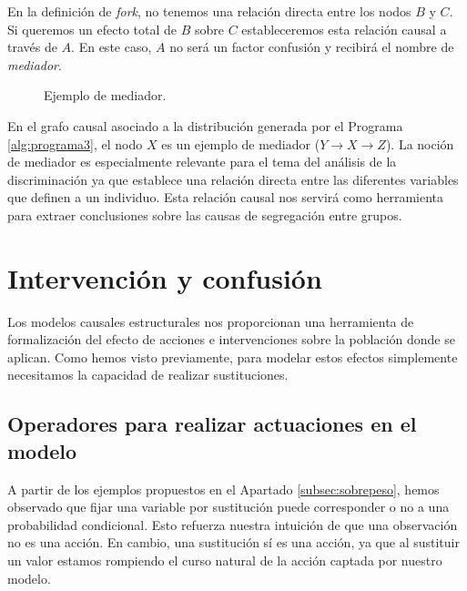 \documentclass[oneside,openright,titlepage,numbers=noenddot,openany,headinclude,footinclude=true,
cleardoublepage=empty,abstractoff,BCOR=5mm,paper=a4,fontsize=12pt,main=spanish]{scrreprt}
\begin{document}
En la definición de \textit{fork}, no tenemos una relación directa entre los nodos $B$ y $C$. Si queremos un efecto total de $B$ sobre $C$ estableceremos esta relación causal a través de $A$. En este caso, $A$ no será un factor confusión y recibirá el nombre de \textit{mediador}.\\

\begin{figure}[h]
\centering
{}
\caption{Ejemplo de mediador.}
\label{fig:mediator}
\end{figure}

En el grafo causal asociado a la distribución generada por el Programa \ref{alg:programa3}, el nodo $X$ es un ejemplo de mediador ($Y \to X \to Z$). La noción de mediador es especialmente relevante para el tema del análisis de la discriminación ya que establece una relación directa entre las diferentes variables que definen a un individuo. Esta relación causal nos servirá como herramienta para extraer conclusiones sobre las causas de segregación entre grupos.

\section{Intervención y confusión}

Los modelos causales estructurales nos proporcionan una herramienta de formalización del efecto de acciones e intervenciones sobre la población donde se aplican. Como hemos visto previamente, para modelar estos efectos simplemente necesitamos la capacidad de realizar sustituciones.

\subsection{Operadores para realizar actuaciones en el modelo}

A partir de los ejemplos propuestos en el Apartado \ref{subsec:sobrepeso}, hemos observado que fijar una variable por sustitución puede corresponder o no a una probabilidad condicional. Esto refuerza nuestra intuición de que una observación no es una acción. En cambio, una sustitución sí es una acción, ya que al sustituir un valor estamos rompiendo el curso natural de la acción captada por nuestro modelo.\\
\end{document}
